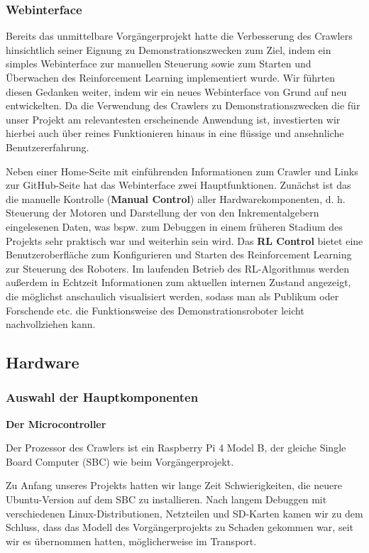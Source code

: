 \subsubsection{Webinterface}

Bereits das unmittelbare Vorgängerprojekt hatte die Verbesserung des Crawlers hinsichtlich seiner Eignung zu Demonstrationszwecken zum Ziel, indem ein simples Webinterface zur manuellen Steuerung sowie zum Starten und Überwachen des Reinforcement Learning implementiert wurde. Wir führten diesen Gedanken weiter, indem wir ein neues Webinterface von Grund auf neu entwickelten. Da die Verwendung des Crawlers zu Demonstrationszwecken die für unser Projekt am relevantesten erscheinende Anwendung ist, investierten wir hierbei auch über reines Funktionieren hinaus in eine flüssige und ansehnliche Benutzererfahrung. 

Neben einer Home-Seite mit einführenden Informationen zum Crawler und Links zur GitHub-Seite hat das Webinterface zwei Hauptfunktionen. Zunächst ist das die manuelle Kontrolle (\textbf{Manual Control}) aller Hardwarekomponenten, d. h. Steuerung der Motoren und Darstellung der von den Inkrementalgebern eingelesenen Daten, was bspw. zum Debuggen in einem früheren Stadium des Projekts sehr praktisch war und weiterhin sein wird. Das \textbf{RL Control} bietet eine Benutzeroberfläche zum Konfigurieren und Starten des Reinforcement Learning zur Steuerung des Roboters. Im laufenden Betrieb des RL-Algorithmus werden außerdem in Echtzeit Informationen zum aktuellen internen Zustand angezeigt, die möglichst anschaulich visualisiert werden, sodass man als Publikum oder Forschende etc. die Funktionsweise des Demonstrationsroboter leicht nachvollziehen kann.

\subsection{Hardware}

\subsubsection{Auswahl der Hauptkomponenten}

\textbf{Der Microcontroller}

Der Prozessor des Crawlers ist ein Raspberry Pi 4 Model B, der gleiche Single Board Computer (SBC) wie beim Vorgängerprojekt.

Zu Anfang unseres Projekts hatten wir lange Zeit Schwierigkeiten, die neuere Ubuntu-Version auf dem SBC zu installieren. Nach langem Debuggen mit verschiedenen Linux-Distributionen, Netzteilen und SD-Karten kamen wir zu dem Schluss, dass das Modell des Vorgängerprojekts zu Schaden gekommen war, seit wir es übernommen hatten, möglicherweise im Transport.


